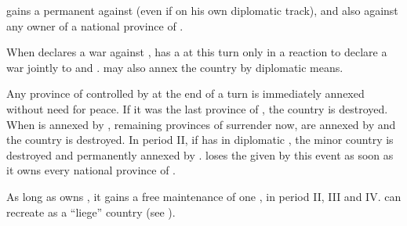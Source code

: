 
\phevnt
\aparag \SPA gains a permanent \CB against \paysNaples (even if on his own
diplomatic track), and also against any owner of a national province of
\paysNaples.

\phdipl
\aparag When \SPA declares a war against \paysNaples, \FRA has a \CB at this
turn only in a reaction to declare a war jointly to \SPA and \paysNaples.
\aparag \SPA may also annex the country by diplomatic means.

\phpaix
\aparag Any province of \paysNaples controlled by \SPA at the end of a turn is
immediately annexed without need for peace. If it was the last province of
\paysNaples, the country is destroyed. When \villeNaples is annexed by \SPA,
remaining provinces of \paysNaples surrender now, are annexed by \SPA and the
country is destroyed.
\aparag In period II, if \SPA has \paysNaples in diplomatic \ANNEXION, the
minor country is destroyed and permanently annexed by \SPA.
\aparag \SPA loses the \CB given by this event as soon as it owns every
national province of \paysNaples.

\effetlong
\aparag As long as \SPA owns \provinceCampania, it gains a free maintenance of
one \FLEET\facemoins, in period II, III and IV.
\aparag \SPA can recreate \paysNaples as a ``liege'' country (see
).



